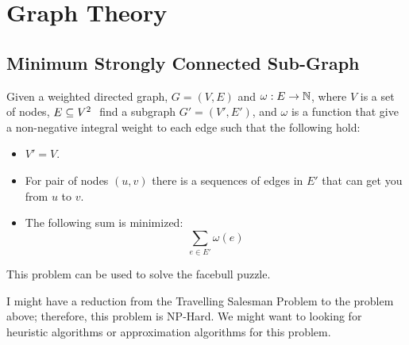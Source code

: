 

\chapter{Graph Theory}
    \section{Minimum Strongly Connected Sub-Graph}
        \begin{problem}
            Given a weighted directed graph, $G = (V, E)$ and $\omega:E \rightarrow \mathbb{N}$,
            where $V$ is a set of nodes, $E \subseteq V^2 \ $ find a subgraph $G' = (V', E')$, and
            $\omega$ is a function that give a non-negative integral weight to each edge such
            that the following hold:
            \begin{itemize}
                \item
                    $V' = V$.
                \item
                    For pair of nodes $(u, v)$ there is a sequences of edges in $E'$ that can
                    get you from $u$ to $v$.
                \item
                    The following sum is minimized:
                    \[
                        \sum_{e \in E'} \omega(e)
                    \]
            \end{itemize}
        \end{problem}
        \begin{note}
            This problem can be used to solve the facebull puzzle.
        \end{note}
        \begin{note}
            I might have a reduction from the Travelling Salesman Problem to the problem
            above; therefore, this problem is NP-Hard. We might want to looking for heuristic
            algorithms or approximation algorithms for this problem.
        \end{note}
        \begin{algorithm}

        \end{algorithm}

